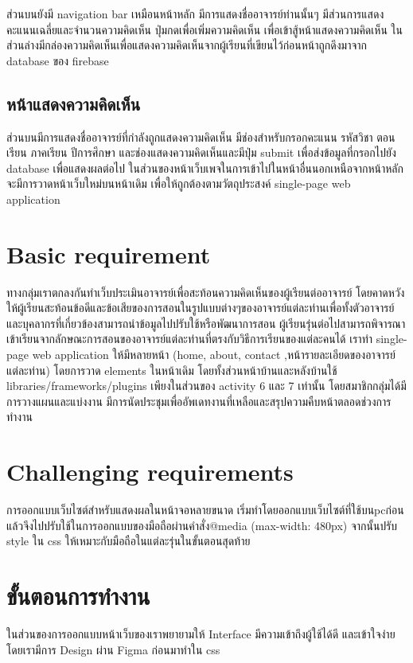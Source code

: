\documentclass[17pt]{extarticle}
\begin{document}
ส่วนบนยังมี navigation bar เหมือนหน้าหลัก มีการแสดงชื่ออาจารย์ท่านนั้นๆ มีส่วนการแสดงคะแนนเฉลี่ยและจำนวนความคิดเห็น ปุ่มกดเพื่อเพิ่มความคิดเห็น เพื่อเข้าสู้หน้าแสดงความคิดเห็น ในส่วนล่างมีกล่องความคิดเห็นเพื่อแสดงความคิดเห็นจากผู้เรียนที่เขียนไว้ก่อนหน้าถูกดึงมาจาก database ของ firebase

\subsection{หน้าแสดงความคิดเห็น}

ส่วนบนมีการแสดงชื่ออาจารย์ที่กำลังถูกแสดงความคิดเห็น มีช่องสำหรับกรอกคะแนน รหัสวิชา ตอนเรียน ภาคเรียน ปีการศึกษา และช่องแสดงความคิดเห็นและมีปุ่ม submit เพื่อส่งข้อมูลที่กรอกไปยัง database เพื่อแสดงผลต่อไป
ในส่วนของหน้าเว็บเพจในการเข้าไปในหน้าอื่นนอกเหนือจากหน้าหลักจะมีการวาดหน้าเว็บใหม่บนหน้าเดิม เพื่อให้ถูกต้องตามวัตถุประสงค์ single-page web application


\pagebreak
\section{Basic requirement}
ทางกลุ่มเราตกลงกันทำเว็บประเมินอาจารย์เพื่อสะท้อนความคิดเห็นของผู้เรียนต่ออาจารย์ โดยคาดหวังให้ผู้เรียนสะท้อนข้อดีและข้อเสียของการสอนในรูปแบบต่างๆของอาจารย์แต่ละท่านเพื่อทั้งตัวอาจารย์และบุคลากรที่เกี่ยวข้องสามารถนำข้อมูลไปปรับใช้หรือพัฒนาการสอน ผู้เรียนรุ่นต่อไปสามารถพิจารณาเข้าเรียนจากลักษณะการสอนของอาจารย์แต่ละท่านที่ตรงกับวิธีการเรียนของแต่ละคนได้ เราทำ single-page web application ให้มีหลายหน้า (home, about, contact ,หน้ารายละเอียดของอาจารย์แต่ละท่าน) โดยการวาด elements ในหน้าเดิม โดยทั้งส่วนหน้าบ้านและหลังบ้านใช้ libraries/frameworks/plugins เพียงในส่วนของ activity 6 และ 7 เท่านั้น โดยสมาชิกกลุ่มได้มีการวางแผนและแบ่งงาน มีการนัดประชุมเพื่ออัพเดทงานที่เหลือและสรุปความคืบหน้าตลอดช่วงการทำงาน
\section{Challenging requirements}

การออกแบบเว็บไซต์สำหรับแสดงผลในหน้าจอหลายขนาด เริ่มทำโดยออกแบบเว็บไซต์ที่ใช้บนpcก่อน แล้วจึงไปปรับใช้ในการออกแบบของมือถือผ่านคำสั่ง@media (max-width: 480px)
จากนั้นปรับ style ใน css ให้เหมาะกับมือถือในแต่ละรุ่นในขั้นตอนสุดท้าย

\section{ขั้นตอนการทำงาน}

ในส่วนของการออกแบบหน้าเว็บของเราพยายามให้ Interface มีความเข้าถึงผู้ใช้ได้ดี และเข้าใจง่าย โดยเรามีการ Design ผ่าน Figma ก่อนมาทำใน css
\end{document}
